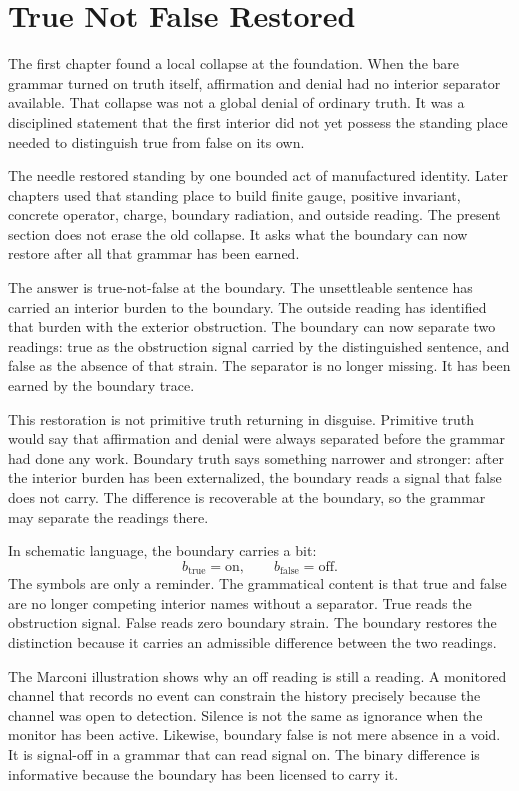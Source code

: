 \section{True Not False Restored}

The first chapter found a local collapse at the foundation. When the bare
grammar turned on truth itself, affirmation and denial had no interior
separator available. That collapse was not a global denial of ordinary
truth. It was a disciplined statement that the first interior did not yet
possess the standing place needed to distinguish true from false on its own.

The needle restored standing by one bounded act of manufactured identity.
Later chapters used that standing place to build finite gauge, positive
invariant, concrete operator, charge, boundary radiation, and outside
reading. The present section does not erase the old collapse. It asks what
the boundary can now restore after all that grammar has been earned.

The answer is true-not-false at the boundary. The unsettleable sentence has
carried an interior burden to the boundary. The outside reading has
identified that burden with the exterior obstruction. The boundary can now
separate two readings: true as the obstruction signal carried by the
distinguished sentence, and false as the absence of that strain. The
separator is no longer missing. It has been earned by the boundary trace.

This restoration is not primitive truth returning in disguise. Primitive
truth would say that affirmation and denial were always separated before the
grammar had done any work. Boundary truth says something narrower and
stronger: after the interior burden has been externalized, the boundary
reads a signal that false does not carry. The difference is recoverable at
the boundary, so the grammar may separate the readings there.

In schematic language, the boundary carries a bit:
\[
  b_{\mathrm{true}} = \mathrm{on},
  \qquad
  b_{\mathrm{false}} = \mathrm{off}.
\]
The symbols are only a reminder. The grammatical content is that true and
false are no longer competing interior names without a separator. True reads
the obstruction signal. False reads zero boundary strain. The boundary
restores the distinction because it carries an admissible difference between
the two readings.

The Marconi illustration shows why an off reading is still a reading. A
monitored channel that records no event can constrain the history precisely
because the channel was open to detection. Silence is not the same as
ignorance when the monitor has been active. Likewise, boundary false is not
mere absence in a void. It is signal-off in a grammar that can read signal
on. The binary difference is informative because the boundary has been
licensed to carry it.

